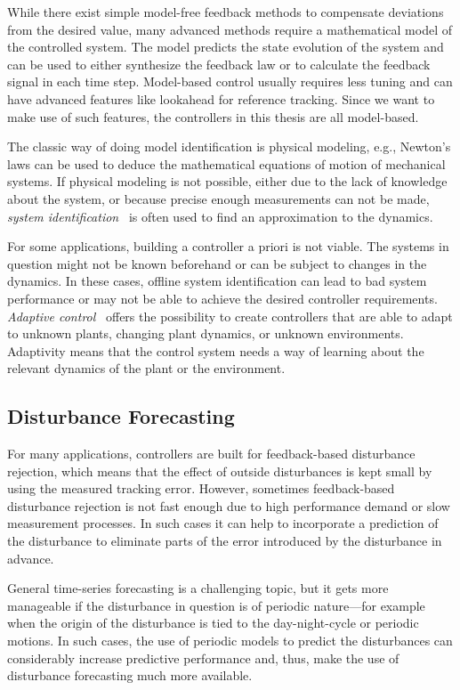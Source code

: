 While there exist simple model-free feedback methods to compensate deviations
from the desired value, many advanced methods require a mathematical model of
the controlled system. The model predicts the state evolution of the system and
can be used to either synthesize the feedback law or to calculate the feedback
signal in each time step. Model-based control usually requires less tuning and
can have advanced features like lookahead for reference tracking. Since we want
to make use of such features, the controllers in this thesis are all
model-based.

The classic way of doing model identification is physical modeling, e.g.,
Newton's laws can be used to deduce the mathematical equations of motion of
mechanical systems. If physical modeling is not possible, either due to the lack
of knowledge about the system, or because precise enough measurements can not be
made, \emph{system identification}~\cite{Ljung:1999:System} is often used to
find an approximation to the dynamics.

For some applications, building a controller a priori is not viable. The
systems in question might not be known beforehand or can be subject to changes
in the dynamics. In these cases, offline system identification can lead to bad
%
system performance or may not be able to achieve the desired controller
requirements. \emph{Adaptive control}~
offers the possibility to create controllers that are able to adapt to unknown
plants, changing plant dynamics, or unknown environments. Adaptivity means that
the control system needs a way of learning about the relevant dynamics of the
plant or the environment.

\subsection*{Disturbance Forecasting}

For many applications, controllers are built for feedback-based disturbance
rejection, which means that the effect of outside disturbances is kept small by
using the measured tracking error. However, sometimes feedback-based
disturbance rejection is not fast enough due to high performance demand or slow
measurement processes. In such cases it can help to incorporate a prediction of
the disturbance to eliminate parts of the error introduced by the disturbance in
advance.

General time-series forecasting is a challenging topic, but it gets more
manageable if the disturbance in question is of periodic nature---for example
when the origin of the disturbance is tied to the day-night-cycle or periodic
motions. In such cases, the use of periodic models to predict the disturbances
can considerably increase predictive performance and, thus, make the use of
disturbance forecasting much more available.

